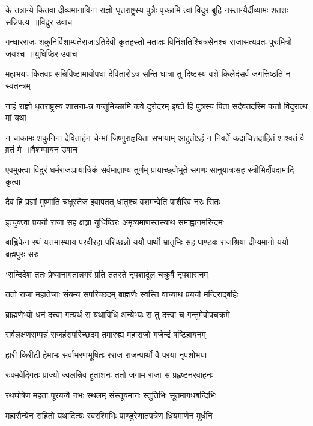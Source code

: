 \twolineshloka
{के तत्रान्ये कितवा दीव्यमानाविना राज्ञो धृतराष्ट्रस्य पुत्रैः}
{पृच्छामि त्वां विदुर ब्रूहि नस्तान्यैर्दीव्यामः शतशः सन्निपत्य ॥विदुर उवाच}


\twolineshloka
{गन्धारराजः शकुनिर्विशाम्पतेराजाऽतिदेवी कृतहस्तो मताक्षः}
{विनिंशतिश्चित्रसेनश्च राजासत्यव्रतः पुरुमित्रो जयश्च ॥युधिष्ठिर उवाच}


\twolineshloka
{महाभयाः कितवाः सन्निविष्टामायोपधा देवितारोऽत्र सन्ति}
{धात्रा तु दिष्टस्य वशे किलेदंसर्वं जगत्तिष्ठति न स्वतन्त्रम्}


\twolineshloka
{नाहं राज्ञो धृतराष्ट्रस्य शासना-न्न गन्तुमिच्छामि कवे दुरोदरम्}
{इष्टो हि पुत्रस्य पिता सदैवतदस्मि कर्ता विदुरात्थ मां यथा}


\twolineshloka
{न चाकामः शकुनिना देविताहंन चेन्मां जिष्णुराह्वयिता सभायाम्}
{आहूतोऽहं न निवर्ते कदाचित्तदाहितं शाश्वतं वै व्रतं मे ॥वैशम्पायन उवाच}


\twolineshloka
{एवमुक्त्वा विदुरं धर्मराजःप्रायात्रिकं सर्वमाज्ञाप्य तूर्णम्}
{प्रायाच्छ्वोभूते सगणः सानुयात्रःसह स्त्रीभिर्दौपदामादि कृत्वा}


\twolineshloka
{दैवं हि प्रज्ञां मुष्णाति चक्षुस्तेज इवापतत्}
{धातुश्च वशमन्वेति पाशैरिव नरः सितः}


\twolineshloka
{इत्युक्त्वा प्रययौ राजा सह क्षत्र्रा युधिष्ठिरः}
{अमृष्यमाणस्तस्याथ समाह्वानमरिन्दमः}


\threelineshloka
{बाह्लिकेन रथं यत्तमास्थाय परवीरहा}
{परिच्छन्नो ययौ पार्थो भ्रातृभिः सह पाण्डवः}
{राजश्रिया दीप्यमानो ययौ ब्रह्मपुरः सरः}


\twolineshloka
{`सन्दिदेश ततः प्रेष्यानागतान्नगरं प्रति}
{ततस्ते नृपशार्दूल चक्रुर्वै नृपशासनम्}


\twolineshloka
{ततो राजा महातेजाः संयम्य सपरिच्छदम्}
{ब्राह्मणैः स्वस्ति वाच्याथ प्रययौ मन्दिराद्बहिः}


\twolineshloka
{ब्राह्मणेभ्यो धनं दत्त्वा गत्यर्थं स यथाविधि}
{अन्येभ्यः स तु दत्त्वा च गन्तुमेवोपचक्रमे}


\twolineshloka
{सर्वलक्षणसम्पन्नं राजहंसपरिच्छदम्}
{तमारुह्य महाराजो गजेन्द्रं षष्टिहायनम्}


\twolineshloka
{हारी किरीटी हेमाभः सर्वाभरणभूषितः}
{रराज राजन्पार्थो वै परया नृपशोभया}


\twolineshloka
{रुक्मवेदिगतः प्राज्यो ज्वलन्निव हुताशनः}
{ततो जगाम राजा स प्रहृष्टनरवाहनः}


\twolineshloka
{रथघोषेण महता पूरयन्वै नभः स्थलम्}
{संस्तूयमानः स्तुतिभिः सूतमागधबन्दिभिः}


\twolineshloka
{महासैन्येन सहितो यथादित्यः स्वरश्मिभिः}
{पाण्डुरेणातपत्रेण ध्रियमाणेन मूर्धनि}


